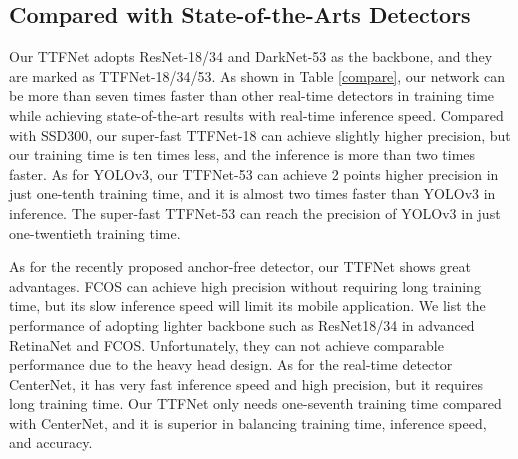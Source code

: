 \documentclass[letterpaper]{article} \usepackage{aaai20}  \usepackage{times}  \usepackage{helvet} \usepackage{courier}  \usepackage[hyphens]{url}  \usepackage{graphicx} \urlstyle{rm} \def\UrlFont{\rm}  \usepackage{graphicx}  \frenchspacing  \setlength{\pdfpagewidth}{8.5in}  \setlength{\pdfpageheight}{11in}  \usepackage{subcaption}
\begin{document}
\begin{table}[!t]
\centering
{}
\caption{TTFNet vs. CenterNet.}
\label{ctnet-ttfnet}
\end{table}

\subsection{Compared with State-of-the-Arts Detectors}

Our TTFNet adopts ResNet-18/34 and DarkNet-53 as the backbone, and they are marked as TTFNet-18/34/53. As shown in Table \ref{compare}, our network can be more than seven times faster than other real-time detectors in training time while achieving state-of-the-art results with real-time inference speed. Compared with SSD300, our super-fast TTFNet-18 can achieve slightly higher precision, but our training time is ten times less, and the inference is more than two times faster. As for YOLOv3, our TTFNet-53 can achieve 2 points higher precision in just one-tenth training time, and it is almost two times faster than YOLOv3 in inference. The super-fast TTFNet-53 can reach the precision of YOLOv3 in just one-twentieth training time.

As for the recently proposed anchor-free detector, our TTFNet shows great advantages. FCOS can achieve high precision without requiring long training time, but its slow inference speed will limit its mobile application. We list the performance of adopting lighter backbone such as ResNet18/34 in advanced RetinaNet and FCOS. Unfortunately, they can not achieve comparable performance due to the heavy head design. As for the real-time detector CenterNet, it has very fast inference speed and high precision, but it requires long training time. Our TTFNet only needs one-seventh training time compared with CenterNet, and it is superior in balancing training time, inference speed, and accuracy.
\end{document}
